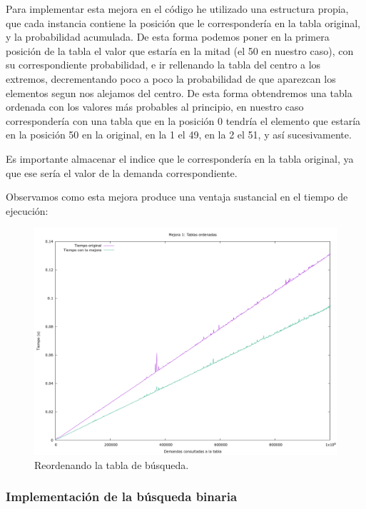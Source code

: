 \documentclass[12pt, spanish]{article}
\begin{document}
Para implementar esta mejora en el código he utilizado una estructura propia, que cada instancia contiene la posición que le correspondería en la tabla original, y la probabilidad acumulada. De esta forma podemos poner en la primera posición de la tabla el valor que estaría en la mitad (el 50 en nuestro caso), con su correspondiente probabilidad, e ir rellenando la tabla del centro a los extremos, decrementando poco a poco la probabilidad de que aparezcan los elementos segun nos alejamos del centro. De esta forma obtendremos una tabla ordenada con los valores más probables al principio, en nuestro caso correspondería con una tabla que en la posición 0 tendría el elemento que estaría en la posición 50 en la original, en la 1 el 49, en la 2 el 51, y así sucesivamente.

Es importante almacenar el indice que le correspondería en la tabla original, ya que ese sería el valor de la demanda correspondiente.

Observamos como esta mejora produce una ventaja sustancial en el tiempo de ejecución:

\begin{figure}[H]
	\centering
	\includegraphics[scale = 0.2]{t_mejora1.png}
	\caption{Reordenando la tabla de búsqueda.}
	\label{fig:ej1_a_150000}

\end{figure}


\subsubsection{Implementación de la búsqueda binaria}
\end{document}
